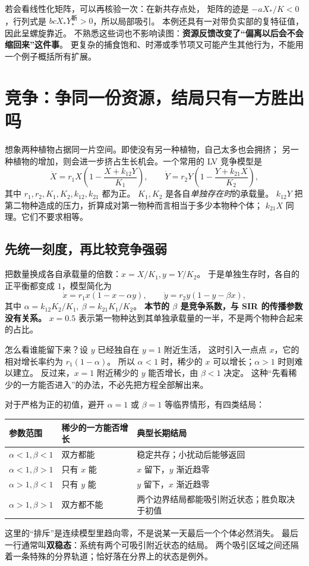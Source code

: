 \documentclass[UTF8,11pt,fontset=none]{ctexart}
\begin{document}
若会看线性化矩阵，可以再核验一次：在新共存点处，
矩阵的迹是 $-aX_*/K<0$，行列式是 $bcX_*Y_*^{\text{新}}>0$，所以局部吸引。
本例还具有一对带负实部的复特征值，因此呈螺旋靠近。
不熟悉这些词也不影响读图：\textbf{资源反馈改变了“偏离以后会不会缩回来”这件事}。
更复杂的捕食饱和、时滞或季节项又可能产生其他行为，不能用一个例子概括所有扩展。

\section{竞争：争同一份资源，结局只有一方胜出吗}
想象两种植物占据同一片空间。即使没有另一种植物，自己太多也会拥挤；
另一种植物的增加，则会进一步挤占生长机会。一个常用的 LV 竞争模型是
\[
\dot X=r_1X\left(1-\frac{X+k_{12}Y}{K_1}\right),\qquad
\dot Y=r_2Y\left(1-\frac{Y+k_{21}X}{K_2}\right),
\]
其中 $r_1,r_2,K_1,K_2,k_{12},k_{21}$ 都为正。
$K_1,K_2$ 是各自\emph{单独存在时}的承载量。
$k_{12}Y$ 把第二物种造成的压力，折算成对第一物种而言相当于多少本物种个体；
$k_{21}X$ 同理。它们不要求相等。

\subsection{先统一刻度，再比较竞争强弱}
把数量换成各自承载量的倍数：$x=X/K_1,y=Y/K_2$。
于是单独生存时，各自的正平衡都变成 $1$，模型简化为
\begin{equation}\label{eq:competition}
\boxed{\dot x=r_1x(1-x-\alpha y),\qquad
\dot y=r_2y(1-y-\beta x),}
\end{equation}
其中 $\alpha=k_{12}K_2/K_1,\ \beta=k_{21}K_1/K_2$。
\textbf{本节的 $\beta$ 是竞争系数，与 SIR 的传播参数没有关系。}
$x=0.5$ 表示第一物种达到其单独承载量的一半，不是两个物种合起来的占比。

怎么看谁能留下来？设 $y$ 已经独自在 $y=1$ 附近生活，
这时引入一点点 $x$，它的相对增长率约为 $r_1(1-\alpha)$。
所以 $\alpha<1$ 时，稀少的 $x$ 可以增长；$\alpha>1$ 时则难以建立。
反过来，$x=1$ 附近稀少的 $y$ 能否增长，由 $\beta<1$ 决定。
这种“先看稀少的一方能否进入”的办法，不必先把方程全部解出来。

对于严格为正的初值，避开 $\alpha=1$ 或 $\beta=1$ 等临界情形，有四类结局：
\begin{center}
\small
\begin{tabular}{p{2.7cm}p{3.2cm}p{7.9cm}}
\toprule
参数范围 & 稀少的一方能否增长 & 典型长期结局\\\midrule
$\alpha<1,\beta<1$ & 双方都能 & 稳定共存；小扰动后能够返回\\
$\alpha<1,\beta>1$ & 只有 $x$ 能 & $x$ 留下，$y$ 渐近趋零\\
$\alpha>1,\beta<1$ & 只有 $y$ 能 & $y$ 留下，$x$ 渐近趋零\\
$\alpha>1,\beta>1$ & 双方都不能 & 两个边界结局都能吸引附近状态；胜负取决于初值\\\bottomrule
\end{tabular}
\end{center}
这里的“排斥”是连续模型里趋向零，不是说某一天最后一个个体必然消失。
最后一行通常叫\textbf{双稳态}：系统有两个可吸引附近状态的结局。
两个吸引区域之间还隔着一条特殊的分界轨道；恰好落在分界上的状态是例外。
\end{document}
